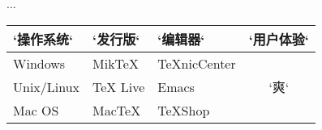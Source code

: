 \usepackage{multirow}
...
\begin{table}[htbp]
\centering
\begin{tabular}{lllc}
    \toprule
    `操作系统` & `发行版` & `编辑器` & `用户体验`\\
    \midrule
    Windows & MikTeX & TeXnicCenter & 
    \multirow{3}{*}{\centering `爽`} \\
    Unix/Linux & TeX Live & Emacs \\
    Mac OS & MacTeX & TeXShop \\
    \bottomrule
\end{tabular}
\end{table}
